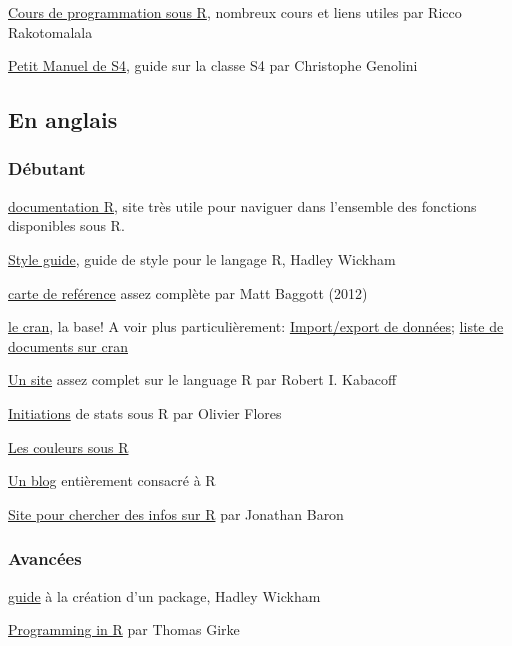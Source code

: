 \documentclass[11, a4paper, landscape]{article}
\newif\ifadvanced
\newcommand{\adv}[1]{\ifadvanced #1 \fi}
\begin{document}
\begin{multicols*}{3}
\href{http://eric.univ-lyon2.fr/~ricco/cours/cours_programmation_R.html}{Cours de programmation sous R}, nombreux cours et liens utiles par Ricco Rakotomalala

\href{http://cran.r-project.org/doc/contrib/Genolini-PetitManuelDeS4.pdf}{Petit Manuel de S4}, guide sur la classe S4 par Christophe Genolini



\subsection{En anglais}

\subsubsection{Débutant}

\href{http://www.rdocumentation.org/}{documentation R}, site très utile pour naviguer dans l'ensemble des fonctions disponibles sous R.

\href{http://r-pkgs.had.co.nz/style.html}{Style guide}, guide de style pour le langage R, Hadley Wickham

\href{http://cran.r-project.org/doc/contrib/Baggott-refcard-v2.pdf}{carte de reférence} assez complète par Matt Baggott (2012)

\href{http://cran.r-project.org}{le cran}, la base! A voir plus particulièrement: \href{http://cran.r-project.org/doc/manuals/R-data.html}{Import/export de données}; \href{http://cran.r-project.org/other-docs.html}{liste de documents sur cran}

\href{http://www.statmethods.net/index.html}{Un site} assez complet sur le language R par Robert I. Kabacoff

\href{http://olivierflores.free.fr/?q=R}{Initiations} de stats sous R par Olivier Flores

\href{http://research.stowers-institute.org/efg/R/Color/Chart/index.htm}{Les couleurs sous R}

\href{http://www.r-bloggers.com/}{Un blog} entièrement consacré à R

\href{http://search.r-project.org/}{Site pour chercher des infos sur R} par Jonathan Baron

\subsubsection{Avancées}

\href{http://r-pkgs.had.co.nz/}{guide} à la création d'un package, Hadley Wickham

\href{http://manuals.bioinformatics.ucr.edu/home/programming-in-r}{Programming in R} par Thomas Girke

\end{multicols*}

\adv{
  \printindex
  \addcontentsline{toc}{subsection}{Index}
}
\end{document}
